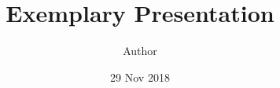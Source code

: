 \documentclass{beamer}
\title{Exemplary Presentation}
\author{Author}
\date{29 Nov 2018}
\begin{document}
\begin{frame}
\titlepage
\end{frame}

\renewcommand{\colorslidenumberbg}{clrsblue}







\end{document}
